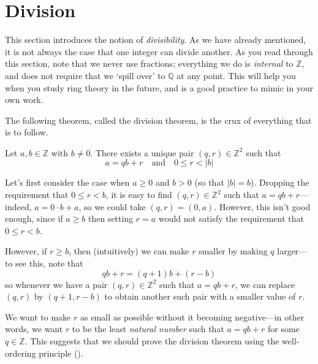 \section{Division}

This section introduces the notion of \textit{divisibility}. As we have already mentioned, it is not always the case that one integer can divide another. As you read through this section, note that we never use fractions; everything we do is \textit{internal} to $\mathbb{Z}$, and does not require that we `spill over' to $\mathbb{Q}$ at any point. This will help you when you study ring theory in the future, and is a good practice to mimic in your own work.

The following theorem, called the division theorem, is the crux of everything that is to follow.

\begin{theorem}
\label{thmDivisionTheorem}
Let $a,b \in \mathbb{Z}$ with $b \ne 0$. There exists a unique pair $(q,r) \in \mathbb{Z}^2$ such that
\[ a = qb + r \quad \text{and} \quad 0 \le r < |b| \]
\end{theorem}

\begin{strategy*}
Let's first consider the case when $a \ge 0$ and $b > 0$ (so that $|b|=b$). Dropping the requirement that $0 \le r < b$, it is easy to find $(q,r) \in \mathbb{Z}^2$ such that $a=qb+r$---indeed, $a = 0 \cdot b + a$, so we could take $(q,r) = (0,a)$. However, this isn't good enough, since if $a \ge b$ then setting $r=a$ would not satisfy the requirement that $0 \le r < b$.

However, if $r \ge b$, then (intuitively) we can make $r$ smaller by making $q$ larger---to see this, note that
\[ qb + r = (q+1)b + (r-b) \]
so whenever we have a pair $(q,r) \in \mathbb{Z}^2$ such that $a=qb+r$, we can replace $(q,r)$ by $(q+1,r-b)$ to obtain another such pair with a smaller value of $r$.

We want to make $r$ as small as possible without it becoming negative---in other words, we want $r$ to be the least \textit{natural number} such that $a=qb+r$ for some $q \in \mathbb{Z}$. This suggests that we should prove the division theorem using the well-ordering principle ().
\end{strategy*}

